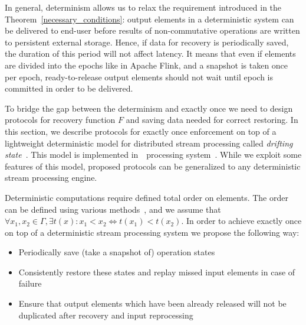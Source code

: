 
\label {fs-consistency-section}

In general, determinism allows us to relax the requirement introduced in the Theorem~\ref{necessary_conditions}: output elements in a deterministic system can be delivered to end-user before results of non-commutative operations are written to persistent external storage. Hence, if data for recovery is periodically saved, the duration of this period will not affect latency. It means that even if elements are divided into the epochs like in Apache Flink, and a snapshot is taken once per epoch, ready-to-release output elements should not wait until epoch is committed in order to be delivered. 

To bridge the gap between the determinism and exactly once we need to design protocols for recovery function $F$ and saving data needed for correct restoring. In this section, we describe protocols for exactly once enforcement on top of a lightweight deterministic model for distributed stream processing called {\em drifting state}~\cite{we2018adbis}. This model is implemented in~\FlameStream\ processing system~\cite{we2018beyondmr}. While we exploit some features of this model, proposed protocols can be generalized to any deterministic stream processing engine.

Deterministic computations require defined total order on elements. The order can be defined using various methods~\cite{we2018seim}, and we assume that $\forall x_1,x_2\in \Gamma, \exists t(x): x_1 < x_2 \Longleftrightarrow t(x_1) < t(x_2)$. In order to achieve exactly once on top of a deterministic stream processing system we propose the following way:
\begin{itemize}
    \item Periodically save (take a snapshot of) operation states
    \item Consistently restore these states and replay missed input elements in case of failure
    \item Ensure that output elements which have been already released will not be duplicated after recovery and input reprocessing
\end{itemize}

